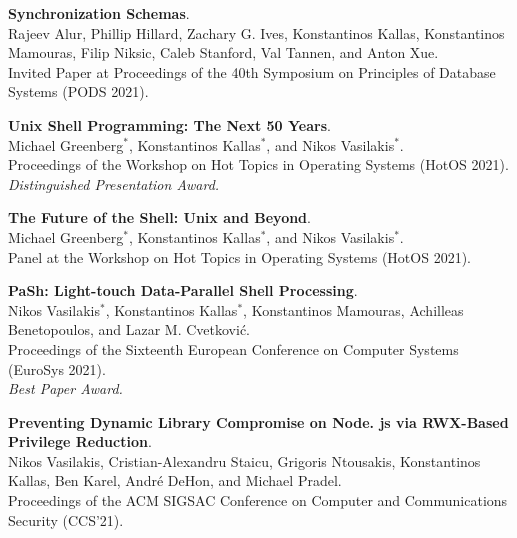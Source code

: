 \begin{minipage}{\textwidth}
\textbf{Synchronization Schemas}. \\
Rajeev Alur, Phillip Hillard, Zachary G. Ives, Konstantinos Kallas, Konstantinos Mamouras, Filip Niksic, Caleb Stanford, Val Tannen, and Anton Xue. \\
Invited Paper at Proceedings of the 40th Symposium on Principles of Database Systems (PODS 2021).
\end{minipage}

\begin{minipage}{\textwidth}
\textbf{Unix Shell Programming: The Next 50 Years}. \\
Michael Greenberg$^*$, Konstantinos Kallas$^*$, and Nikos Vasilakis$^*$. \\
Proceedings of the Workshop on Hot Topics in Operating Systems (HotOS 2021).\\
 \emph{Distinguished Presentation Award.}
\end{minipage}

\begin{minipage}{\textwidth}
\textbf{The Future of the Shell: Unix and Beyond}. \\
Michael Greenberg$^*$, Konstantinos Kallas$^*$, and Nikos Vasilakis$^*$. \\
Panel at the Workshop on Hot Topics in Operating Systems (HotOS 2021).
\end{minipage}

\begin{minipage}{\textwidth}
\textbf{PaSh: Light-touch Data-Parallel Shell Processing}. \\
Nikos Vasilakis$^*$, Konstantinos Kallas$^*$, Konstantinos Mamouras, Achilleas Benetopoulos, and Lazar M. Cvetković. \\
Proceedings of the Sixteenth European Conference on Computer Systems (EuroSys 2021).\\
 \emph{Best Paper Award.}
\end{minipage}

\begin{minipage}{\textwidth}
\textbf{Preventing Dynamic Library Compromise on Node. js via RWX-Based Privilege Reduction}. \\
Nikos Vasilakis, Cristian-Alexandru Staicu, Grigoris Ntousakis, Konstantinos Kallas, Ben Karel, André DeHon, and Michael Pradel. \\
Proceedings of the ACM SIGSAC Conference on Computer and Communications Security (CCS’21).
\end{minipage}


